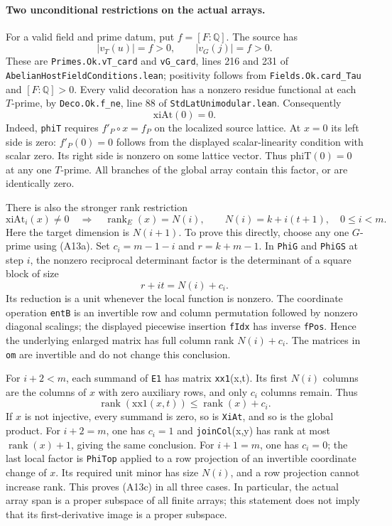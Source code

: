 \documentclass[11pt]{article}
\newcommand{\Q}{\mathbb Q}\newcommand{\C}{\mathbb C}\newcommand{\Z}{\mathbb Z}\newcommand{\R}{\mathbb R}\newcommand{\A}{\mathbb A}\newcommand{\OO}{\mathcal O}
\theoremstyle{definition}\newtheorem{definition}[theorem]{Definition}\newtheorem{remark}[theorem]{Remark}
\begin{document}
\paragraph{Two unconditional restrictions on the actual arrays.}
For a valid field and prime datum, put $f=[F:\Q]$.
The source has
\[
        |v_T(u)|=f>0,\qquad |v_G(j)|=f>0.
        \tag{A13a}
\]
These are \texttt{Primes.Ok.vT\_card} and
\texttt{vG\_card}, lines 216 and 231 of
\nolinkurl{AbelianHostFieldConditions.lean}; positivity follows
from \texttt{Fields.Ok.card\_Tau} and $[F:\Q]>0$.
Every valid decoration has a nonzero residue functional at
each $T$-prime, by \texttt{Deco.Ok.f\_ne}, line 88 of
\texttt{StdLatUnimodular.lean}.
Consequently
\[
                         \mathrm{xiAt}(0)=0.
                         \tag{A13b}
\]
Indeed, \texttt{phiT} requires $f'_P\circ x=f_P$ on the
localized source lattice.  At $x=0$ its left side is zero:
$f'_P(0)=0$ follows from the displayed scalar-linearity
condition with scalar zero.  Its right side is nonzero on
some lattice vector.  Thus $\mathrm{phiT}(0)=0$ at any one
$T$-prime.  All branches of the global array contain this
factor, or are identically zero.

There is also the stronger rank restriction
\[
 \mathrm{xiAt}_i(x)\ne0
           \quad\Longrightarrow\quad
             \operatorname{rank}_E(x)=N(i),
       \qquad N(i)=k+i(t+1),\quad 0\leq i<m.
 \tag{A13c}
\]
Here the target dimension is $N(i+1)$.
To prove this directly, choose any one $G$-prime using
(A13a).  Set $c_i=m-1-i$ and $r=k+m-1$.
In \texttt{PhiG} and \texttt{PhiGS} at step $i$,
the nonzero reciprocal determinant factor is the determinant
of a square block of size
\[
               r+it=N(i)+c_i.
\]
Its reduction is a unit whenever the local function is nonzero.
The coordinate operation \texttt{entB} is an invertible row
and column permutation followed by nonzero diagonal scalings;
the displayed piecewise insertion \texttt{fIdx} has inverse
\texttt{fPos}.  Hence the underlying enlarged matrix has full
column rank $N(i)+c_i$.  The matrices in \texttt{om} are
invertible and do not change this conclusion.

For $i+2<m$, each summand of \texttt{E1} has matrix
\texttt{xx1}(x,t).  Its first $N(i)$ columns are the columns
of $x$ with zero auxiliary rows, and only $c_i$ columns
remain.  Thus
\[
       \operatorname{rank}(\mathrm{xx1}(x,t))
                     \leq\operatorname{rank}(x)+c_i.
\]
If $x$ is not injective, every summand is zero, so is
\texttt{XiAt}, and so is the global product.
For $i+2=m$, one has $c_i=1$ and
\texttt{joinCol}(x,y) has rank at most
$\operatorname{rank}(x)+1$, giving the same conclusion.
For $i+1=m$, one has $c_i=0$; the last local factor is
\texttt{PhiTop} applied to a row projection of an invertible
coordinate change of $x$.  Its required unit minor has size
$N(i)$, and a row projection cannot increase rank.
This proves (A13c) in all three cases.  In particular, the
actual array span is a proper subspace of all finite arrays;
this statement does not imply that its first-derivative image
is a proper subspace.
\end{document}
